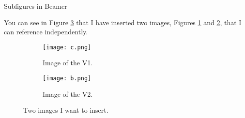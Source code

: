 

\begin{frame}{Subfigures in Beamer}

    You can see in Figure \ref{fig:images} that I have inserted two images, Figures \ref{fig:nature1} and \ref{fig:nature2}, that I can reference independently.
    
    \begin{figure}
    \centering
        \begin{subfigure}[t]{0.4\textwidth}
            \texttt{[image: c.png]}
            \caption{Image of the V1.}
            \label{fig:nature1}
        \end{subfigure}
        \begin{subfigure}[b]{0.4\textwidth}
            \texttt{[image: b.png]}
            \caption{Image of the V2.}
            \label{fig:nature2}
        \end{subfigure}
    \caption{Two images I want to insert.}
    \label{fig:images}
    \end{figure}
    
\end{frame}